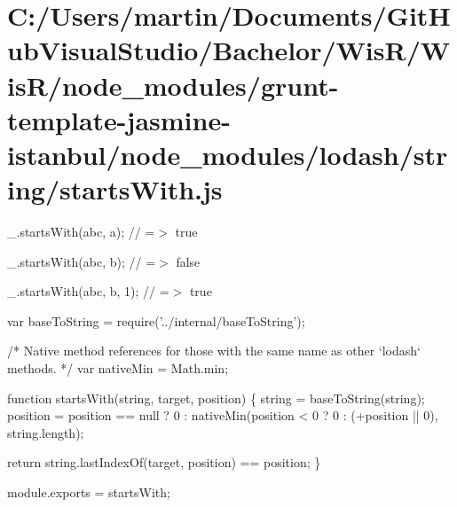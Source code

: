 \hypertarget{_c_1_2_users_2martin_2_documents_2_git_hub_visual_studio_2_bachelor_2_wis_r_2_wis_r_2node_modulef7b64fa5ac90e24cb7efebb11f6658e1}{}\section{C\+:/\+Users/martin/\+Documents/\+Git\+Hub\+Visual\+Studio/\+Bachelor/\+Wis\+R/\+Wis\+R/node\+\_\+modules/grunt-\/template-\/jasmine-\/istanbul/node\+\_\+modules/lodash/string/starts\+With.\+js}
\+\_\+.\+starts\+With(\textquotesingle{}abc\textquotesingle{}, \textquotesingle{}a\textquotesingle{}); // =$>$ true

\+\_\+.\+starts\+With(\textquotesingle{}abc\textquotesingle{}, \textquotesingle{}b\textquotesingle{}); // =$>$ false

\+\_\+.\+starts\+With(\textquotesingle{}abc\textquotesingle{}, \textquotesingle{}b\textquotesingle{}, 1); // =$>$ true


\begin{DoxyCodeInclude}
var baseToString = require(\textcolor{stringliteral}{'../internal/baseToString'});

\textcolor{comment}{/* Native method references for those with the same name as other `lodash` methods. */}
var nativeMin = Math.min;

\textcolor{keyword}{function} startsWith(\textcolor{keywordtype}{string}, target, position) \{
  \textcolor{keywordtype}{string} = baseToString(\textcolor{keywordtype}{string});
  position = position == null
    ? 0
    : nativeMin(position < 0 ? 0 : (+position || 0), \textcolor{keywordtype}{string}.length);

  \textcolor{keywordflow}{return} \textcolor{keywordtype}{string}.lastIndexOf(target, position) == position;
\}

module.exports = startsWith;
\end{DoxyCodeInclude}
 